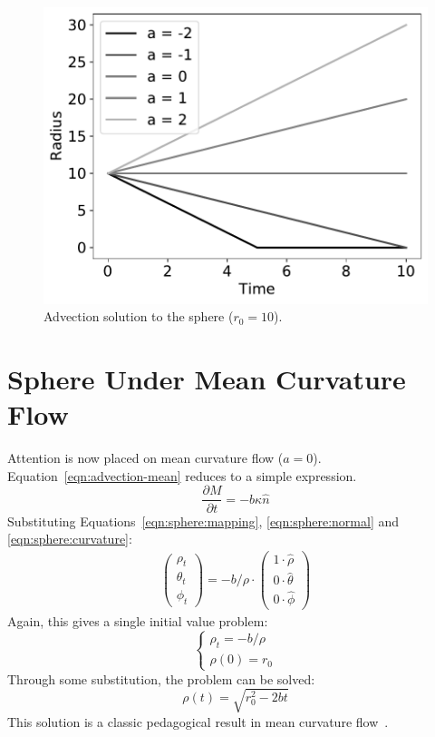\documentclass[journal]{IEEEtran}
\begin{document}
\begin{figure}[t]
  \centering
    \includegraphics[width=0.9\linewidth]{advection}%
  \caption{Advection solution to the sphere ($r_0 = 10$).}
  \label{fig:advection}
\end{figure}

\section{Sphere Under Mean Curvature Flow}
\label{sec:meanflow}
Attention is now placed on mean curvature flow ($a = 0$).
Equation~\ref{eqn:advection-mean} reduces to a simple expression.
\begin{equation}
  \label{eqn:mean}
  \frac{\partial M}{\partial t} = -b \kappa \hat{n}
\end{equation}
Substituting Equations~\ref{eqn:sphere:mapping}, \ref{eqn:sphere:normal} and \ref{eqn:sphere:curvature}:
\begin{align}
  \begin{pmatrix}
    \rho_t \\
    \theta_t \\
    \phi_t
  \end{pmatrix} = -b / \rho \cdot
  \begin{pmatrix}
    1 \cdot \hat{\rho} \\
    0 \cdot \hat{\theta} \\
    0 \cdot \hat{\phi}
  \end{pmatrix}
\end{align}
Again, this gives a single initial value problem:
\begin{equation}
  \left\{
    \begin{array}{ll}
      \rho_t = -b/\rho\\
      \rho(0) = r_0
    \end{array}
  \right.
\end{equation}
Through some substitution, the problem can be solved:
\begin{equation}
  \label{eqn:mean:solution}
  \rho(t) = \sqrt{r_0^2 - 2bt}
\end{equation}
This solution is a classic pedagogical result in mean curvature flow~\cite{bellettini2014lecture}.
\end{document}
